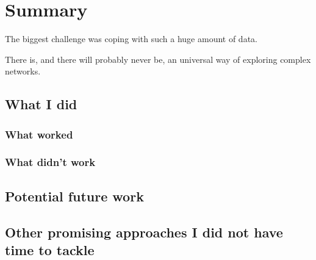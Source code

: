 \chapter{Summary}

  The biggest challenge was coping with such a huge amount of data.

  There is, and there will probably never be, an universal way of exploring complex networks.

  \section{What I did}

    \subsection{What worked}

	\subsection{What didn't work}

    \section{Potential future work}

    \section{Other promising approaches I did not have time to tackle}